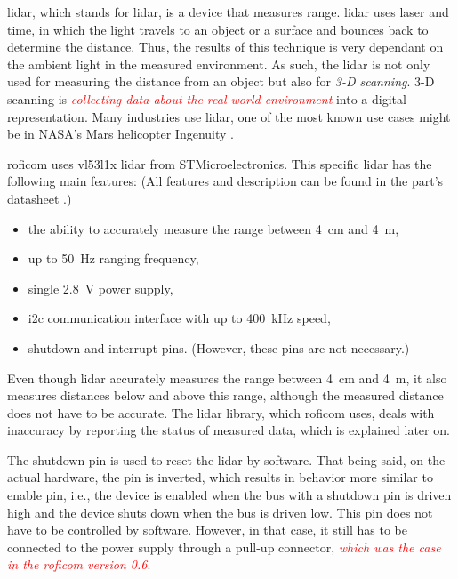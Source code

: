 \documentclass[
  digital,     %
  oneside,     %
  nosansbold,  %
  nocolorbold, %
  lof,         %
  lot,         %
]{fithesis4}
\newcommand{\TODO}[1]{\textcolor{red}{\textit{#1}}}
\begin{document}
{{{\acrshort{lidar}, which stands for \acrlong{lidar}, is a device that measures range. \acrshort{lidar} uses laser and time, in which the light travels to an object or a surface and bounces back to determine the distance. Thus, the results of this technique is very dependant on the ambient light in the measured environment. As such, the \acrshort{lidar} is not only used for measuring the distance from an object but also for \emph{3-D scanning}. 3-D scanning is \TODO{collecting data about the real world environment} into a digital representation. Many industries use \acrshort{lidar}, one of the most known use cases might be in NASA's Mars helicopter Ingenuity \cite{garmin-lidar}.

\acrshort{roficom} uses \gls{vl53l1x} \acrshort{lidar} from STMicroelectronics. This specific \acrshort{lidar} has the following main features: (All features and description can be found in the part's datasheet \cite{vl53l1x}.)

\begin{itemize}
    \item the ability to accurately measure the range between \qty{4}{\centi\metre} and \qty{4}{\metre},
    \item up to \qty{50}{\hertz} ranging frequency,
    \item single \qty{2.8}{\volt} power supply,
    \item \acrshort{i2c} communication interface with up to \qty{400}{\kilo\hertz} speed,
    \item shutdown and interrupt pins. (However, these pins are not necessary.)
\end{itemize}

Even though \acrshort{lidar} accurately measures the range between \qty{4}{\centi\metre} and \qty{4}{\metre}, it also measures distances below and above this range, although the measured distance does not have to be accurate. The lidar library, which \acrshort{roficom} uses, deals with inaccuracy by reporting the status of measured data, which is explained later on.

The shutdown pin is used to reset the \acrshort{lidar} by software. That being said, on the actual hardware, the pin is inverted, which results in behavior more similar to enable pin, i.e., the device is enabled when the bus with a shutdown pin is driven high and the device shuts down when the bus is driven low. This pin does not have to be controlled by software. However, in that case, it still has to be connected to the power supply through a pull-up connector, \TODO{which was the case in the \acrshort{roficom} version 0.6}.

}}}
\end{document}

